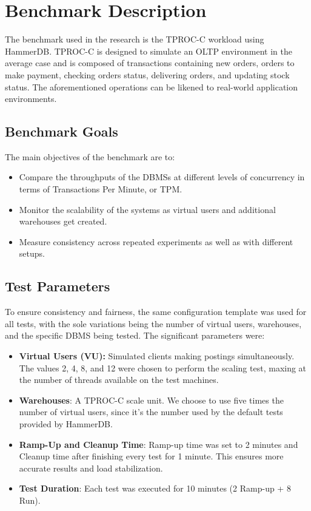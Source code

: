 \section{Benchmark Description}
\label{sec:benchmark}

The benchmark used in the research is the TPROC-C workload using HammerDB. TPROC-C is designed to simulate an OLTP environment in the average case and is composed of transactions containing new orders, orders to make payment, checking orders status, delivering orders, and updating stock status. The aforementioned operations can be likened to real-world application environments.

\subsection{Benchmark Goals}

The main objectives of the benchmark are to:

\begin{itemize}
    \setlength\itemsep{0.1em}
    \item Compare the throughputs of the DBMSs at different levels of concurrency in terms of Transactions Per Minute, or TPM.
    \item Monitor the scalability of the systems as virtual users and additional warehouses get created.
    \item Measure consistency across repeated experiments as well as with different setups.
\end{itemize}

\subsection{Test Parameters}

To ensure consistency and fairness, the same configuration template was used for all tests, with the sole variations being the number of virtual users, warehouses, and the specific DBMS being tested. The significant parameters were:

\begin{itemize}
    \setlength\itemsep{0.1em}
    \item \textbf{Virtual Users (VU):} Simulated clients making postings simultaneously. The values 2, 4, 8, and 12 were chosen to perform the scaling test, maxing at the number of threads available on the test machines.
    \item \textbf{Warehouses}: A TPROC-C scale unit. We choose to use five times the number of virtual users, since it's the number used by the default tests provided by HammerDB.
    \item \textbf{Ramp-Up and Cleanup Time}: Ramp-up time was set to 2 minutes and Cleanup time after finishing every test for 1 minute. This ensures more accurate results and load stabilization.
    \item \textbf{Test Duration}: Each test was executed for 10 minutes (2 Ramp-up + 8 Run).
\end{itemize}

